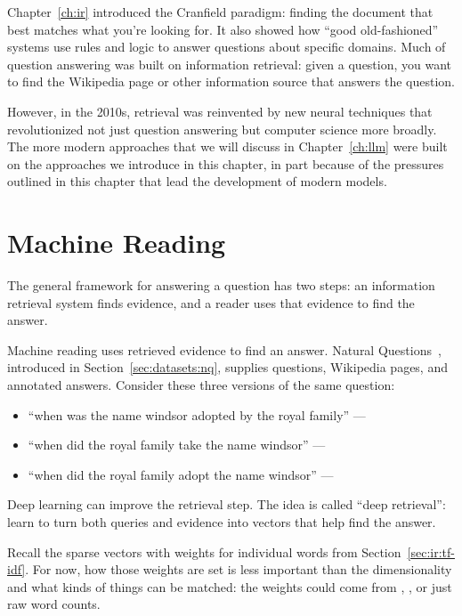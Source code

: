 

\label{chapter:formats}

Chapter~\ref{ch:ir} introduced the Cranfield paradigm: finding the
document that best matches what you're looking for.  It also showed
how ``good old-fashioned''  systems use rules and logic to
answer questions about specific domains.
%
Much of question answering was built on information retrieval: given a
question, you want to find the Wikipedia page or other information
source that answers the question.

However, in the 2010s, retrieval was reinvented by new neural
techniques that revolutionized not just question answering but
computer science more broadly.
%
The more modern approaches that we will discuss in
Chapter~\ref{ch:llm} were built on the approaches we introduce in this
chapter, in part because of the pressures outlined in this chapter
that lead the development of modern  models.


\section{Machine Reading}

The general framework for answering a question has two steps: an
information retrieval system finds evidence, and a reader uses that
evidence to find the answer.

Machine reading uses retrieved evidence to find an answer.  Natural Questions~\citep{kwiatkowski-19}, introduced in Section~\ref{sec:datasets:nq}, supplies questions, Wikipedia pages, and annotated answers.
Consider these three versions of the same question:
\begin{itemize}
\item ``when was the name windsor adopted by the royal family'' --- 
\item ``when did the royal family take the name windsor'' --- 
\item ``when did the royal family adopt the name windsor'' --- 
\end{itemize}


Deep learning can improve the retrieval step.
The idea is called ``deep retrieval'': learn to turn both queries and
evidence into vectors that help find the answer.

Recall the sparse vectors with weights for individual words from
Section~\ref{sec:ir:tf-idf}.  For now, how those weights are set is
less important than the dimensionality and what kinds of things can
be matched: the weights could come from \tfidf{}, , or
just raw word counts.

